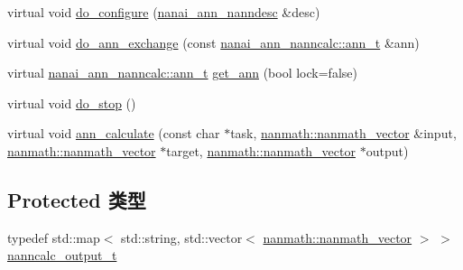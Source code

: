 \begin{DoxyCompactItemize}
\item 
virtual void \hyperlink{classnanai_1_1nanai__ann__nanncalc_ad76affc9e9819af44025704d424ce3ec}{do\+\_\+configure} (\hyperlink{namespacenanai_a892a8c80381d0005a076b68fbbf2d918}{nanai\+\_\+ann\+\_\+nanndesc} \&desc)
\item 
virtual void \hyperlink{classnanai_1_1nanai__ann__nanncalc_a3501b12051f6bb169b408a3671196f16}{do\+\_\+ann\+\_\+exchange} (const \hyperlink{classnanai_1_1nanai__ann__nanncalc_1_1ann__t}{nanai\+\_\+ann\+\_\+nanncalc\+::ann\+\_\+t} \&ann)
\item 
virtual \hyperlink{classnanai_1_1nanai__ann__nanncalc_1_1ann__t}{nanai\+\_\+ann\+\_\+nanncalc\+::ann\+\_\+t} \hyperlink{classnanai_1_1nanai__ann__nanncalc_aefda6586e9dd96625b2e2948baec8e18}{get\+\_\+ann} (bool lock=false)
\item 
virtual void \hyperlink{classnanai_1_1nanai__ann__nanncalc_a1973ea663b28bcc31a7297d75bae139e}{do\+\_\+stop} ()
\item 
virtual void \hyperlink{classnanai_1_1nanai__ann__nanncalc_aeebc06b5241f6f9e1e5b78daa7e31911}{ann\+\_\+calculate} (const char $\ast$task, \hyperlink{classnanmath_1_1nanmath__vector}{nanmath\+::nanmath\+\_\+vector} \&input, \hyperlink{classnanmath_1_1nanmath__vector}{nanmath\+::nanmath\+\_\+vector} $\ast$target, \hyperlink{classnanmath_1_1nanmath__vector}{nanmath\+::nanmath\+\_\+vector} $\ast$output)
\end{DoxyCompactItemize}
\subsection*{Protected 类型}
\begin{DoxyCompactItemize}
\item 
typedef std\+::map$<$ std\+::string, std\+::vector$<$ \hyperlink{classnanmath_1_1nanmath__vector}{nanmath\+::nanmath\+\_\+vector} $>$ $>$ \hyperlink{classnanai_1_1nanai__ann__nanncalc_a44c56088d31cafacdb5324d36a88fd51}{nanncalc\+\_\+output\+\_\+t}
\end{DoxyCompactItemize}
